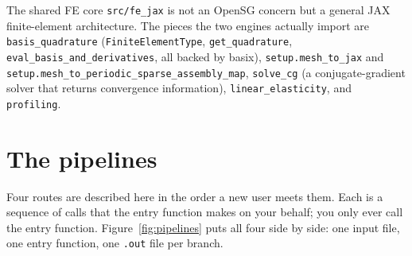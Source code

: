 The shared FE core \texttt{src/fe\_jax} is not an OpenSG concern but a general
JAX finite-element architecture. The pieces the two engines actually import are
\texttt{basis\_quadrature} (\texttt{FiniteElementType}, \texttt{get\_quadrature},
\texttt{eval\_basis\_and\_derivatives}, all backed by basix),
\texttt{setup.mesh\_to\_jax} and
\texttt{setup.mesh\_to\_periodic\_sparse\_assembly\_map},
\texttt{solve\_cg} (a conjugate-gradient solver that returns convergence
information), \texttt{linear\_elasticity}, and \texttt{profiling}.

\section{The pipelines}
\label{sec:pipelines}

Four routes are described here in the order a new user meets them. Each is a
sequence of calls that the entry function makes on your behalf; you only ever
call the entry function. Figure~\ref{fig:pipelines} puts all four side by side:
one input file, one entry function, one \texttt{.out} file per branch.

